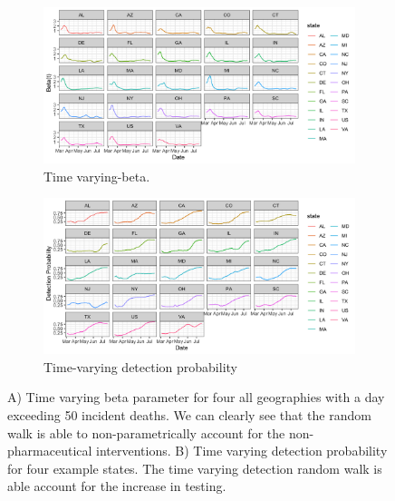 \documentclass[11pt]{amsart}
\begin{document}
\begin{figure}
  \centering
     \begin{subfigure}{1\textwidth}
  \centering
    \includegraphics[scale=.2]{beta_t_plot.png}
    \caption{Time varying-beta.}
\end{subfigure}

\begin{subfigure}{1\textwidth}
  \centering
    \includegraphics[scale=.2]{detection_plot.png}
    \caption{Time-varying detection probability}
\end{subfigure} 
 \caption{  A) Time varying beta parameter for four all geographies with a day exceeding 50 incident deaths. We can clearly see that the random walk is able to non-parametrically account for the non-pharmaceutical interventions. B) Time varying detection probability for four example states. The time varying detection random walk is able account for the increase in testing. }
\label{fig:model_details}
\end{figure}
\end{document}

